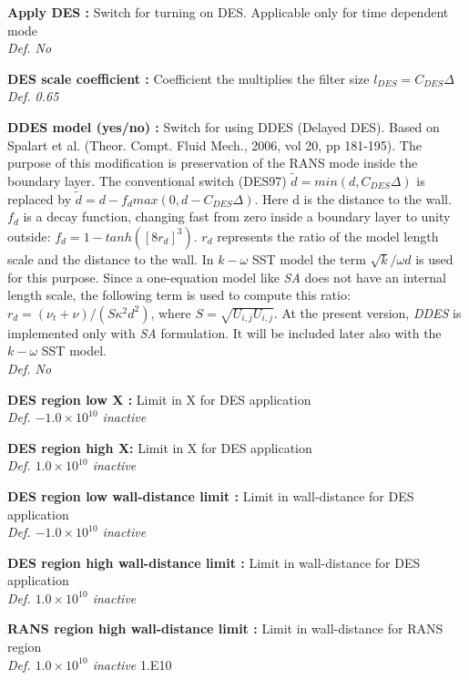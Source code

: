 \documentclass[12pt,epsf,colordvi]{article}
\begin{document}
\begin{description}
 \item { \bf Apply DES :}  Switch for turning on DES. Applicable only for time dependent mode \\
 { \it Def. No }
%
 \item{ \bf DES scale coefficient : } Coefficient the multiplies the filter size \(l_{DES} = C_{DES} \Delta\) \\
{\it Def.  0.65}
%
 \item { \bf DDES model (yes/no) :}  Switch for using DDES (Delayed DES). Based on Spalart et al. (Theor. Compt. Fluid Mech., 
       2006, vol 20, pp 181-195). The purpose of this modification is preservation of the RANS mode inside the boundary layer. 
       The conventional switch (DES97)
       \(\tilde d = min(d,C_{DES} \Delta )\) is replaced by 
       \(\tilde d = d-f_d max(0,d-C_{DES} \Delta) \). Here d is the distance to the wall. \(f_d\) is a  decay function, 
       changing fast from zero inside a boundary layer to unity outside: \(f_d=1-tanh([8r_d]^3) \). \(r_d\) represents the 
       ratio of the model length scale and the distance to the wall. In \(k-\omega \) SST model the term 
         \(\sqrt{k} / \omega d\) is used for this purpose. Since a one-equation model like {\it SA} does not have an internal
       length scale, the following term is used to compute this ratio: 
        \(r_d = {{(\nu_t + \nu) } / { (S \kappa^2 d^2 )}}\), where \(S = \sqrt{U_{i,j} U_{i,j} }  \). At the present version,
        {\it DDES } is implemented only with {\it SA} formulation. It will be included later also with the \(k-\omega \) SST model.
  \\        
 { \it Def. No }
% 
 \item{ \bf DES region low X :} Limit in X for DES application \\
{\it Def.  \(-1.0\times10^10\) inactive }
% 
\item{ \bf DES region high X:}  Limit in X for DES application \\
{\it Def.  \(1.0\times10^10\) inactive } 
%
\item{ \bf  DES region low wall-distance limit :} Limit in wall-distance for DES application \\
{\it Def.  \(-1.0\times10^10\) inactive } 
%
 \item{ \bf  DES region high wall-distance limit  :} Limit in wall-distance for DES application \\
{\it Def.  \(1.0\times10^10\) inactive }  
%
 \item{ \bf  RANS region high wall-distance limit :} Limit in wall-distance for RANS region \\
{\it Def.  \(1.0\times10^10\) inactive }  1.E10 
%
\end{description}
%
%
\noindent
\end{document}
